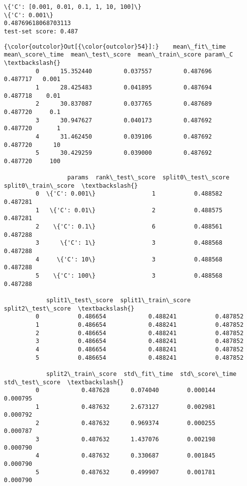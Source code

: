 \documentclass[11pt]{article}
\begin{document}
    \begin{Verbatim}[commandchars=\\\{\}]
\{'C': [0.001, 0.01, 0.1, 1, 10, 100]\}
\{'C': 0.001\}
0.48769618068703113
test-set score: 0.487

    \end{Verbatim}

            \begin{Verbatim}[commandchars=\\\{\}]
{\color{outcolor}Out[{\color{outcolor}54}]:}    mean\_fit\_time  mean\_score\_time  mean\_test\_score  mean\_train\_score param\_C  \textbackslash{}
         0      15.352440         0.037557         0.487696          0.487717   0.001   
         1      28.425483         0.041895         0.487694          0.487718    0.01   
         2      30.837087         0.037765         0.487689          0.487720     0.1   
         3      30.947627         0.040173         0.487692          0.487720       1   
         4      31.462450         0.039106         0.487692          0.487720      10   
         5      30.429259         0.039000         0.487692          0.487720     100   
         
                  params  rank\_test\_score  split0\_test\_score  split0\_train\_score  \textbackslash{}
         0  \{'C': 0.001\}                1           0.488582            0.487281   
         1   \{'C': 0.01\}                2           0.488575            0.487281   
         2    \{'C': 0.1\}                6           0.488561            0.487288   
         3      \{'C': 1\}                3           0.488568            0.487288   
         4     \{'C': 10\}                3           0.488568            0.487288   
         5    \{'C': 100\}                3           0.488568            0.487288   
         
            split1\_test\_score  split1\_train\_score  split2\_test\_score  \textbackslash{}
         0           0.486654            0.488241           0.487852   
         1           0.486654            0.488241           0.487852   
         2           0.486654            0.488241           0.487852   
         3           0.486654            0.488241           0.487852   
         4           0.486654            0.488241           0.487852   
         5           0.486654            0.488241           0.487852   
         
            split2\_train\_score  std\_fit\_time  std\_score\_time  std\_test\_score  \textbackslash{}
         0            0.487628      0.074040        0.000144        0.000795   
         1            0.487632      2.673127        0.002981        0.000792   
         2            0.487632      0.969374        0.000255        0.000787   
         3            0.487632      1.437076        0.002198        0.000790   
         4            0.487632      0.330687        0.001845        0.000790   
         5            0.487632      0.499907        0.001781        0.000790   
         

\end{Verbatim}
\end{document}
